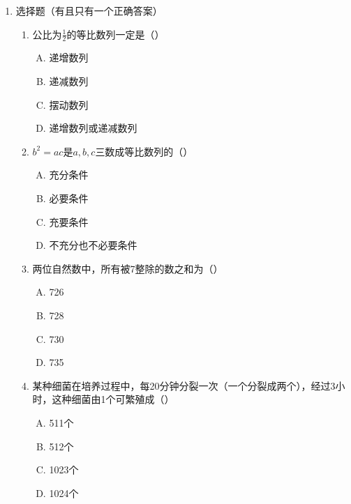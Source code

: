 \begin{enumerate}
    \item 选择题（有且只有一个正确答案）
\begin{enumerate}[(1)]
    \item 公比为$\frac{1}{2}$的等比数列一定是（\qquad ）
\begin{multicols}{2}
\begin{enumerate}[(A)]
    \item 递增数列
    \item 递减数列
    \item 摆动数列
    \item 递增数列或递减数列
\end{enumerate}
\end{multicols}

\item $b^2=ac$是$a,b,c$三数成等比数列的（\qquad）
\begin{multicols}{2}
    \begin{enumerate}[(A)]
        \item 充分条件
        \item 必要条件
        \item 充要条件
        \item 不充分也不必要条件
    \end{enumerate}
    \end{multicols}

\item 两位自然数中，所有被7整除的数之和为（\qquad）
\begin{multicols}{4}
\begin{enumerate}[(A)]
    \item 726
    \item 728
    \item 730
    \item 735
\end{enumerate}
\end{multicols}

\item 某种细菌在培养过程中，每20分钟分裂一次（一个分裂成两个），经过3小时，这种细菌由1个可繁殖成（\qquad）
\begin{multicols}{2}
\begin{enumerate}[(A)]
    \item 511个
    \item 512个
    \item 1023个
    \item 1024个
\end{enumerate}
\end{multicols}


\end{enumerate}
\end{enumerate}
